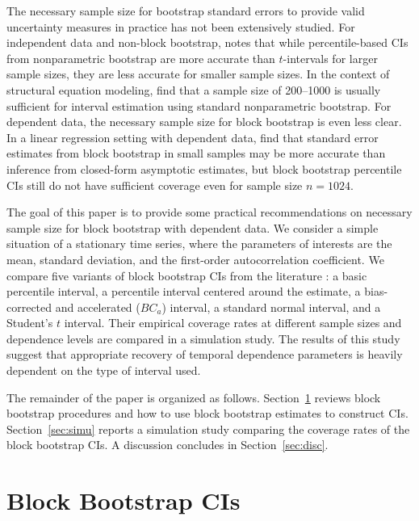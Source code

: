 \documentclass[12pt, letterpaper, titlepage]{article}
\begin{document}
The necessary sample size for bootstrap standard errors to provide valid
uncertainty measures in practice has not been extensively studied. For
independent data and non-block bootstrap, \citet{hesterberg2015teachers} notes
that while percentile-based CIs from nonparametric bootstrap
are more accurate than $t$-intervals for larger sample sizes, they are
less accurate for smaller sample sizes. In the context of structural equation
modeling, \citet{nevitt2001performance} find
that a sample size of 200--1000 is usually sufficient for interval estimation
using standard nonparametric bootstrap. For dependent data, the necessary
sample
size for block bootstrap is even less clear. In a linear regression setting
with
dependent data, \citet{goncalves2005bootstrap} find that standard error
estimates from block bootstrap in small samples may be more accurate than
inference from closed-form asymptotic estimates, but block bootstrap percentile
CIs still do not have sufficient coverage even for sample size
$n = 1024$.


The goal of this paper is to provide some practical recommendations on
necessary sample size for block bootstrap with dependent data. We consider a
simple situation of a stationary time series, where the parameters of
interests are the mean, standard deviation, and the first-order
autocorrelation coefficient. We compare five variants of block bootstrap
CIs from the literature \citep{diciccio1996bootstrap,
  rice2006mathematical}: a basic percentile interval, a percentile
interval centered around the estimate, a bias-corrected and
accelerated ($BC_a$) interval, a standard normal interval, and a Student's $t$
interval. Their
empirical coverage rates at different sample sizes and dependence levels are
compared in a simulation study. The results of this study suggest that
appropriate recovery of temporal dependence parameters is heavily dependent on
the type of interval used.


The remainder of the paper is organized as follows.
Section~\ref{sec:bbci} reviews block bootstrap procedures and how to use block
bootstrap estimates to construct CIs. Section~\ref{sec:simu} reports a
simulation
study comparing the coverage rates of the block bootstrap CIs. A discussion
concludes in Section~\ref{sec:disc}.


\section{Block Bootstrap CIs}
\label{sec:bbci}
\end{document}
